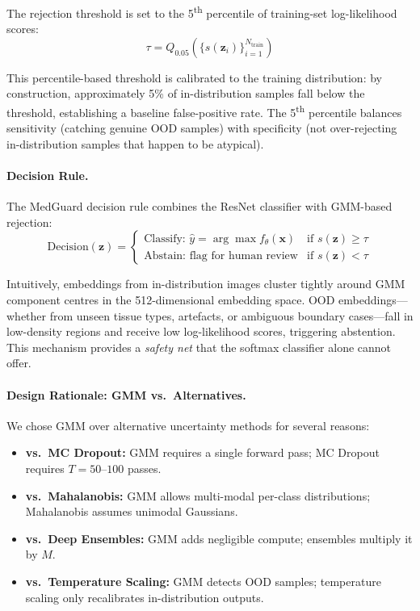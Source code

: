 \documentclass{article}
\begin{document}
The rejection threshold is set to the 5\textsuperscript{th} percentile of training-set log-likelihood scores:
\begin{equation}
    \tau = Q_{0.05}\left(\{s(\mathbf{z}_i)\}_{i=1}^{N_{\text{train}}}\right)
    \label{eq:threshold}
\end{equation}

This percentile-based threshold is calibrated to the training distribution: by construction, approximately 5\% of in-distribution samples fall below the threshold, establishing a baseline false-positive rate. The 5\textsuperscript{th} percentile balances sensitivity (catching genuine OOD samples) with specificity (not over-rejecting in-distribution samples that happen to be atypical).

\paragraph{Decision Rule.}
The MedGuard decision rule combines the ResNet classifier with GMM-based rejection:
\begin{equation}
    \text{Decision}(\mathbf{z}) = \begin{cases}
        \text{Classify: } \hat{y} = \arg\max f_\theta(\mathbf{x}) & \text{if } s(\mathbf{z}) \geq \tau \\
        \text{Abstain: flag for human review} & \text{if } s(\mathbf{z}) < \tau
    \end{cases}
    \label{eq:decision}
\end{equation}

Intuitively, embeddings from in-distribution images cluster tightly around GMM component centres in the 512-dimensional embedding space. OOD embeddings---whether from unseen tissue types, artefacts, or ambiguous boundary cases---fall in low-density regions and receive low log-likelihood scores, triggering abstention. This mechanism provides a \emph{safety net} that the softmax classifier alone cannot offer.

\paragraph{Design Rationale: GMM vs.\ Alternatives.}
We chose GMM over alternative uncertainty methods for several reasons:
\begin{itemize}
    \item \textbf{vs.\ MC Dropout:} GMM requires a single forward pass; MC Dropout requires $T = 50$--$100$ passes.
    \item \textbf{vs.\ Mahalanobis:} GMM allows multi-modal per-class distributions; Mahalanobis assumes unimodal Gaussians.
    \item \textbf{vs.\ Deep Ensembles:} GMM adds negligible compute; ensembles multiply it by $M$.
    \item \textbf{vs.\ Temperature Scaling:} GMM detects OOD samples; temperature scaling only recalibrates in-distribution outputs.
\end{itemize}
\end{document}
